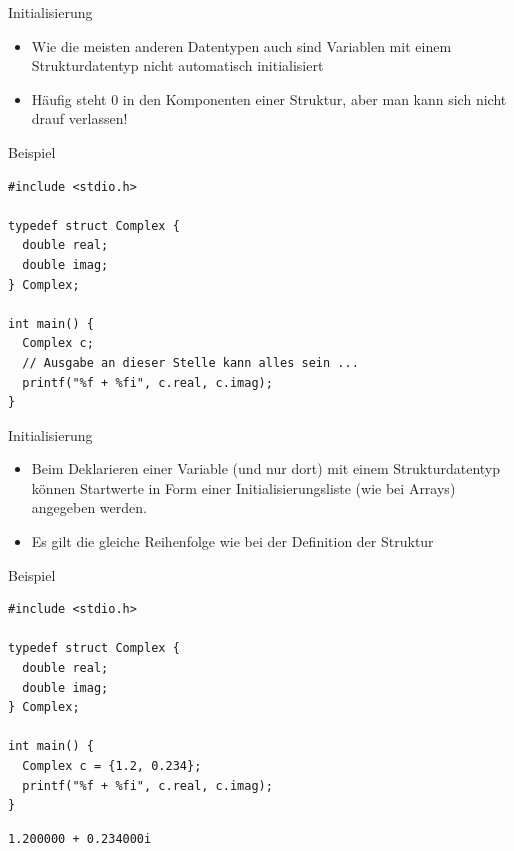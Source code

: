 \documentclass[presentation]{beamer}
\begin{document}
\begin{frame}[label={sec:org74833db},fragile]{Initialisierung}
 \begin{itemize}
\item Wie die meisten anderen Datentypen auch sind Variablen mit einem
Strukturdatentyp nicht automatisch initialisiert
\item Häufig steht 0 in den Komponenten einer Struktur, aber \alert{man kann
sich nicht drauf verlassen}!
\end{itemize}
\begin{exampleblock}{Beispiel}
\begin{verbatim}
#include <stdio.h>

typedef struct Complex {
  double real;
  double imag;
} Complex;

int main() {
  Complex c;
  // Ausgabe an dieser Stelle kann alles sein ...
  printf("%f + %fi", c.real, c.imag);
}
\end{verbatim}
\end{exampleblock}
\end{frame}
\begin{frame}[label={sec:org168afee},fragile]{Initialisierung}
 \begin{itemize}
\item Beim Deklarieren einer Variable (\alert{und nur dort}) mit einem
Strukturdatentyp können Startwerte in Form einer
\alert{Initialisierungsliste} (wie bei Arrays) angegeben werden.
\item Es gilt die \alert{gleiche Reihenfolge} wie bei der Definition der
Struktur
\end{itemize}
\begin{exampleblock}{Beispiel}
\begin{verbatim}
#include <stdio.h>

typedef struct Complex {
  double real;
  double imag;
} Complex;

int main() {
  Complex c = {1.2, 0.234};
  printf("%f + %fi", c.real, c.imag);
}
\end{verbatim}

\begin{verbatim}
1.200000 + 0.234000i
\end{verbatim}
\end{exampleblock}
\end{frame}
\end{document}
